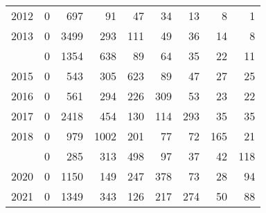 \documentclass[
]{article}
\begin{document}
\begin{longtable}[t]{lrrrrrrrr}
2012 & 0 & 697 & 91 & 47 & 34 & 13 & 8 & 1\\
2013 & 0 & 3499 & 293 & 111 & 49 & 36 & 14 & 8\\
\addlinespace
2014 & 0 & 1354 & 638 & 89 & 64 & 35 & 22 & 11\\
2015 & 0 & 543 & 305 & 623 & 89 & 47 & 27 & 25\\
2016 & 0 & 561 & 294 & 226 & 309 & 53 & 23 & 22\\
2017 & 0 & 2418 & 454 & 130 & 114 & 293 & 35 & 35\\
2018 & 0 & 979 & 1002 & 201 & 77 & 72 & 165 & 21\\
\addlinespace
2019 & 0 & 285 & 313 & 498 & 97 & 37 & 42 & 118\\
2020 & 0 & 1150 & 149 & 247 & 378 & 73 & 28 & 94\\
2021 & 0 & 1349 & 343 & 126 & 217 & 274 & 50 & 88\\*
\end{longtable}
\end{document}
